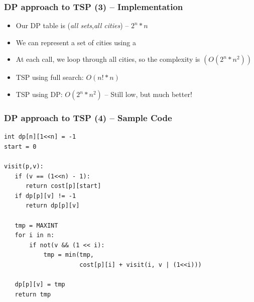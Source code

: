 \begin{frame}
  \frametitle{DP approach to TSP (3) -- Implementation}

    \begin{exampleblock}{}
      \begin{itemize}
      \item Our DP table is (\emph{all sets},\emph{all cities}) -- $2^n * n$
      \item We can represent a set of cities using a 
      \item At each call, we loop through all cities, so the complexity is $(O(2^n*n^2))$

        \bigskip

      \item TSP using full search: $O(n!*n)$
      \item TSP using DP: $O(2^n*n^2)$ -- Still low, but much better!
      \end{itemize}
    \end{exampleblock}
\end{frame}

\begin{frame}[fragile]
  \frametitle{DP approach to TSP (4) -- Sample Code}

{\smaller
  \begin{exampleblock}{}
\begin{verbatim}
int dp[n][1<<n] = -1
start = 0

visit(p,v):
   if (v == (1<<n) - 1):
      return cost[p][start]
   if dp[p][v] != -1
      return dp[p][v]

   tmp = MAXINT
   for i in n:
       if not(v && (1 << i):
           tmp = min(tmp,
                     cost[p][i] + visit(i, v | (1<<i)))

   dp[p][v] = tmp
   return tmp
\end{verbatim}
  \end{exampleblock}}
\end{frame}


